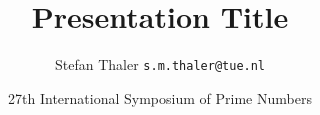 \documentclass{beamer}
\title{Presentation Title}
\date[ISPN ’80]{27th International Symposium of Prime Numbers}
\author[sthaler]{Stefan Thaler \texttt{s.m.thaler@tue.nl}}
\begin{document}
%
%

\begin{frame}[title-01]
\end{frame}

\begin{frame}[title-02]
\end{frame}

\begin{frame}[title-03]
\end{frame}

%
%
\begin{frame}[content-a1]
\end{frame}

\begin{frame}[content-a2]
\end{frame}

%
%
\begin{frame}[content-b1]
\end{frame}

\begin{frame}[content-b2]
\end{frame}

\begin{frame}[content-b3]
\end{frame}

%
%
\begin{frame}[content-c1]
\end{frame}

\begin{frame}[content-c2]
\end{frame}

\begin{frame}[content-c3]
\end{frame}

\begin{frame}[content-c4]
\end{frame}
\end{document}
